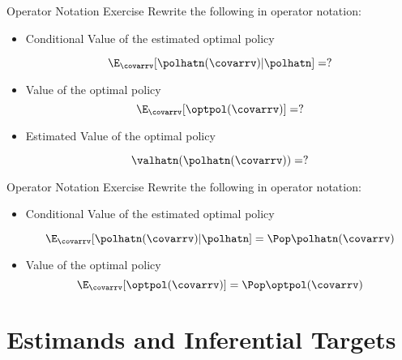 \documentclass[aspectratio=169, professionalfonts]{beamer}
\begin{document}
\begin{frame}{Operator Notation Exercise}
	Rewrite the following in operator notation:
	\vfill
	\begin{itemize}

		\item Conditional Value of the estimated optimal policy

		      $$\E_{\covarrv}[\polhatn(\covarrv) \vert \polhatn] = ?$$

		\item Value of the optimal policy
		      $$\E_{\covarrv}[\optpol(\covarrv)] = ?$$

		\item Estimated Value of the optimal policy

		      $$\valhatn(\polhatn(\covarrv)) = ?$$
	\end{itemize}
	\vfill

\end{frame}


\begin{frame}{Operator Notation Exercise}
	Rewrite the following in operator notation:
	\vfill
	\begin{itemize}

		\item Conditional Value of the estimated optimal policy

		      $$\E_{\covarrv}[\polhatn(\covarrv) \vert \polhatn] = \Pop \polhatn(\covarrv)$$

		\item Value of the optimal policy
		      $$\E_{\covarrv}[\optpol(\covarrv)] = \Pop \optpol(\covarrv)$$
	\end{itemize}
	\vfill

\end{frame}

\section{Estimands and Inferential Targets}
\end{document}
